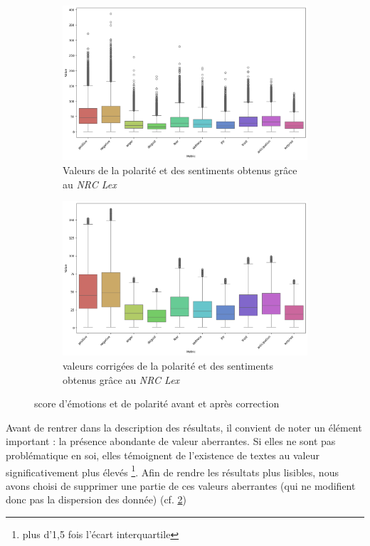 \documentclass[12pt,a4paper,oneside,titlepage]{book} %
\begin{document}
	 
	 \begin{figure}[htbp]
	 	\centering
	 	\begin{subfigure}[b]{0.45\textwidth}
	 		\includegraphics[width=\textwidth]{illustration/emotions.png}
	 		\caption{Valeurs de la polarité et des sentiments obtenus grâce au \emph{NRC Lex}}
	 		\label{fig:emotions}
	 	\end{subfigure}
	 	\hfill
	 	\begin{subfigure}[b]{0.45\textwidth}
	 		\includegraphics[width=\textwidth]{illustration/emotions_corrected.png}
	 		\caption{valeurs corrigées de la polarité et des sentiments obtenus grâce au \emph{NRC Lex}}
	 		\label{fig:emotions_corrected}
	 	\end{subfigure}
	 	\caption{score d'émotions et de polarité avant et après correction}
	 	\label{fig:emotions_both}
	 \end{figure}
	 
	 Avant de rentrer dans la description des résultats, il convient de noter un élément important : la présence abondante de valeur aberrantes. Si elles ne sont pas problématique en soi, elles témoignent de l'existence de textes au valeur significativement plus élevés \footnote{plus d'1,5 fois l'écart interquartile}. 
	 Afin de rendre les résultats plus lisibles, nous avons choisi de supprimer une partie de ces valeurs aberrantes (qui ne modifient donc pas la dispersion des donnée) (cf. \ref{fig:emotions_corrected})
\end{document}
